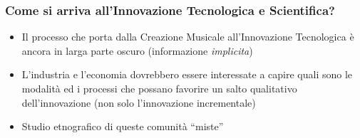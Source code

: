 \begin{frame}
    \frametitle<+- | alert@+->{Come si arriva all'Innovazione Tecnologica e Scientifica?}

    \begin{itemize}[<+- | alert@+->]
        \item Il processo che porta dalla Creazione Musicale all'Innovazione
            Tecnologica \`e ancora in larga parte oscuro (informazione
            \emph{implicita})
        \item L'industria e l'economia dovrebbero essere interessate a capire quali
            sono le modalit\`a ed i processi che possano favorire un salto
            qualitativo dell'innovazione (non solo l'innovazione incrementale)
        \item Studio etnografico di queste comunit\`a ``miste''
    \end{itemize}
    
\end{frame}
